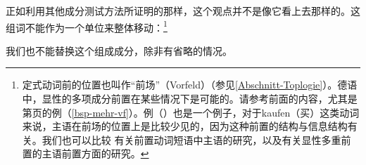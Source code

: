 正如利用其他成分测试方法所证明的那样，这个观点并不是像它看上去那样的。这组词不能作为一个单位来整体移动：\footnote{%
定式动词前的位置也叫作“前场”（Vorfeld）（参见\ref{Abschnitt-Toplogie}）。德语中，显性的多项成分前置在某些情况下是可能的。请参考前面的内容，尤其是第\pageref{bsp-mehr-vf}页的例（\ref{bsp-mehr-vf}）。例（）也是一个例子，对于kaufen（买）这类动词来说，主语在前场的位置上是比较少见的，因为这种前置的结构与信息结构有关。我们也可以比较\citet{dKM2003a} 有关前置动词短语中主语的研究，以及\citet[]{BC2010a}有关显性多重前置的主语前置方面的研究。
}
\z

\noindent
我们也不能替换这个组成成分，除非有省略的情况。

